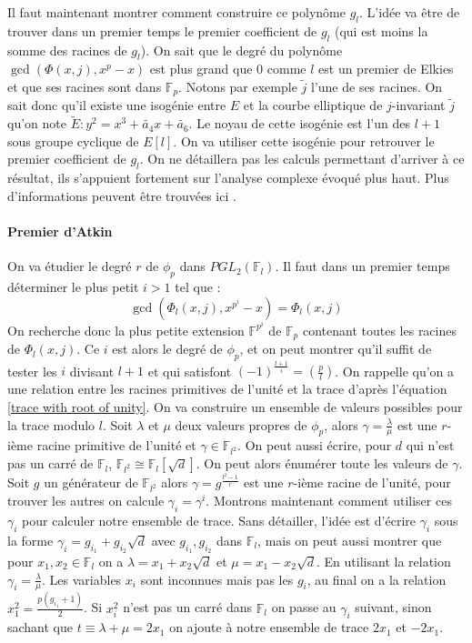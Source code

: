 \documentclass[12pt]{article}
\begin{document}
Il faut maintenant montrer comment construire ce polynôme $g_l$. L'idée va être de trouver dans un premier temps le premier coefficient de $g_l$ (qui est moins la somme des racines de $g_l$). On sait que le degré du polynôme $\gcd(\Phi(x,j),x^p-x)$ est plus grand que $0$ comme $l$ est un premier de Elkies et que ses racines sont dans $\mathbb{F}_p$. Notons par exemple $\tilde{j}$ l'une de ses racines. On sait donc qu'il existe une isogénie entre $E$ et la courbe elliptique de $j$-invariant $\tilde{j}$ qu'on note $\tilde{E}:y^2=x^3+\tilde{a_4}x+\tilde{a_6}$. Le noyau de cette isogénie est l'un des $l+1$ sous groupe cyclique de $E[l]$. On va utiliser cette isogénie pour retrouver le premier coefficient de $g_l$. On ne détaillera pas les calculs permettant d'arriver à ce résultat, ils s'appuient fortement sur l'analyse complexe évoqué plus haut. Plus d'informations peuvent être trouvées ici \cite{sea}.


\paragraph*{Premier d'Atkin}
On va étudier le degré $r$ de $\phi_p$ dans $PGL_2(\mathbb{F}_l)$. Il faut dans un premier temps déterminer le plus petit $i>1$ tel que : 
\begin{equation}
\gcd(\Phi_l(x,j), x^{p^i} - x) = \Phi_l(x,j)
\end{equation}
On recherche donc la plus petite extension $\mathbb{F}^{p^i}$ de $\mathbb{F}_p$ contenant toutes les racines de $\Phi_l(x,j)$. Ce $i$ est alors le degré de $\phi_p$, et on peut montrer qu'il suffit de tester les $i$ divisant $l+1$ et qui satisfont $(-1)^{\frac{l+1}{i}}= (\frac{p}{l})$. On rappelle qu'on a une relation entre les racines primitives de l'unité et la trace d’après l'équation \ref{trace with root of unity}. On va construire un ensemble de valeurs possibles pour la trace modulo $l$. Soit $\lambda$ et $\mu$ deux valeurs propres de $\phi_p$, alors $\gamma = \frac{\lambda}{\mu}$ est une $r$-ième racine primitive de l'unité et $\gamma \in \mathbb{F}_{l^2}$. On peut aussi écrire, pour $d$ qui n'est pas un carré de $\mathbb{F}_l$, $\mathbb{F}_{l^2} \cong \mathbb{F}_l[\sqrt{d}]$. On peut alors énumérer toute les valeurs de $\gamma$. Soit $g$ un générateur de $\mathbb{F}_{l^2}$ alors $\gamma = g^{\frac{l^2-1}{r}}$ est une $r$-ième racine de l'unité, pour trouver les autres on calcule $\gamma_i = \gamma^i$. Montrons maintenant comment utiliser ces $\gamma_i$ pour calculer notre ensemble de trace. Sans détailler, l'idée est d'écrire $\gamma_i$ sous la forme $\gamma_i = g_{i_1} + g_{i_2}\sqrt{d}$ avec $g_{i_1}, g_{i_2}$ dans $\mathbb{F}_l$, mais on peut aussi montrer que pour $x_1, x_2 \in \mathbb{F}_l$ on a $\lambda = x_1 + x_2\sqrt{d}$ et $\mu = x_1-x_2\sqrt{d}$. En utilisant la relation $\gamma_i = \frac{\lambda}{\mu}$. Les variables $x_i$ sont inconnues mais pas les $g_{i}$, au final on a la relation $x_1^2 = \frac{p(g_{i_1}+1)}{2}$. Si $x_i^2$ n'est pas un carré dans $\mathbb{F}_l$ on passe au $\gamma_i$ suivant, sinon sachant que $t \equiv \lambda + \mu = 2x_1$ on ajoute à notre ensemble de trace $2x_1$ et $-2x_1$.
\end{document}
